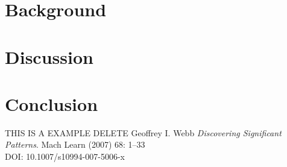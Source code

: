 \documentclass[10pt,a4paper]{article}
\begin{document}
\section{Background} 
\section{Discussion} 
\section{Conclusion} 







\pagebreak
\begin{thebibliography}{9}

THIS IS A EXAMPLE DELETE
Geoffrey I. Webb
\textit{Discovering Significant Patterns}. 
Mach Learn (2007) 68: 1–33\\
DOI: 10.1007/s10994-007-5006-x




\end{thebibliography}
\end{document}
